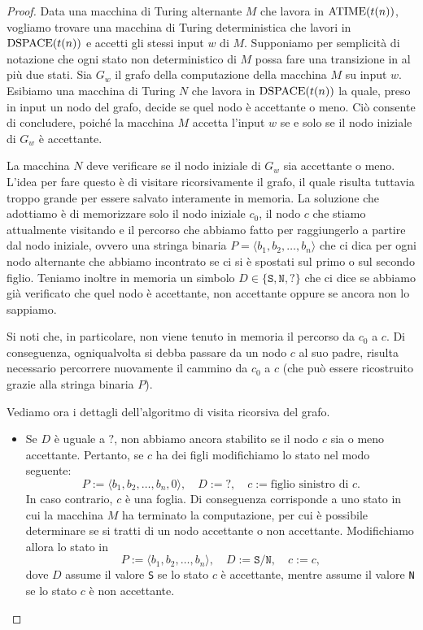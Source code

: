\begin{proof}
 Data una macchina di Turing alternante $M$ che lavora in $\operatorname{ATIME}(t(n))$, vogliamo trovare
 una macchina di Turing deterministica che lavori in $\operatorname{DSPACE}(t(n))$ e accetti gli
 stessi input $w$ di $M$. Supponiamo per semplicità di notazione che ogni stato
 non deterministico di $M$ possa fare una transizione in al più due stati.
 Sia $G_w$ il grafo della computazione della macchina $M$ su input $w$.
 Esibiamo una macchina di Turing $N$ che lavora in $\operatorname{DSPACE}(t(n))$ la quale, preso in input un nodo
 del grafo, decide se quel nodo è accettante o meno. Ciò consente di concludere, poiché
 la macchina $M$ accetta l'input $w$ se e solo se il nodo iniziale
 di $G_w$ è accettante.
 
 La macchina $N$ deve verificare se il nodo iniziale di $G_w$ sia accettante o
 meno. L'idea per fare questo è di visitare ricorsivamente il grafo, il quale risulta tuttavia
  troppo grande per essere salvato interamente in memoria. La soluzione che adottiamo
 è di memorizzare solo il nodo iniziale $c_0$, il nodo $c$ che stiamo attualmente
 visitando e il percorso che abbiamo fatto per raggiungerlo a partire dal nodo
 iniziale, ovvero una stringa binaria $P = \langle b_1, b_2, \ldots, b_n \rangle$
 che ci dica per ogni nodo alternante
 che abbiamo incontrato se ci si è spostati sul primo o sul secondo figlio.
 Teniamo inoltre in memoria un simbolo $D \in \{\texttt{S}, \texttt{N}, \texttt{?}\}$ che ci dice se
 abbiamo già verificato che quel nodo è accettante, non accettante oppure
 se ancora non lo sappiamo.
 
 Si noti che, in particolare, non viene tenuto in memoria il percorso da $c_0$ a $c$.
 Di conseguenza, ogniqualvolta si debba passare da un nodo $c$ al suo padre,
 risulta necessario percorrere nuovamente il cammino da $c_0$ a $c$ (che può essere
 ricostruito grazie alla stringa binaria $P$).
 
 Vediamo ora i dettagli dell'algoritmo di visita ricorsiva del grafo.
 \begin{itemize}
  \item  Se $D$ è uguale a $\texttt{?}$, non abbiamo ancora stabilito se il nodo $c$ sia o meno
  accettante. Pertanto, se $c$ ha dei figli modifichiamo lo stato nel modo seguente:
  \[ P := \langle b_1, b_2, \ldots, b_n, 0 \rangle, \quad D := \texttt{?}, \quad c := \text{figlio sinistro di $c$}. \]
  In caso contrario, $c$ è una foglia. Di conseguenza corrisponde a uno stato in cui la macchina $M$
  ha terminato la computazione, per cui è possibile determinare se si tratti di un
  nodo accettante o non accettante. Modifichiamo allora lo stato in
  \[ P := \langle b_1, b_2, \ldots, b_n \rangle, \quad D := \texttt{S}/\texttt{N}, \quad c := c, \]
  dove $D$ assume il valore \texttt{S} se lo stato $c$ è accettante, mentre assume il valore \texttt{N} se lo stato $c$
  è non accettante.
  

\end{itemize}
\end{proof}

